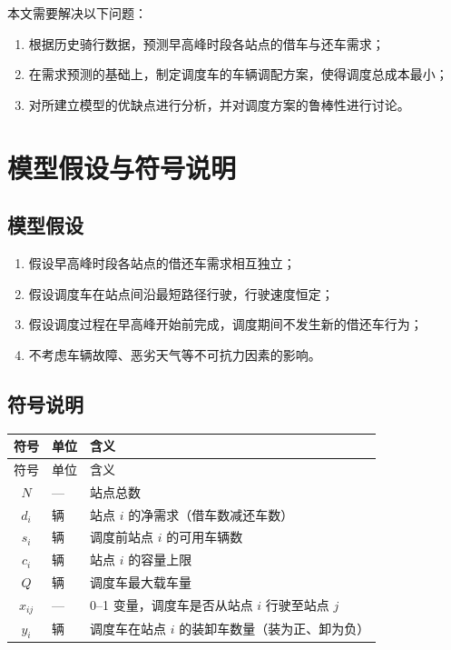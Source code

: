 \documentclass[zihao=-4,a4paper]{ctexart}
\begin{document}
\quad 本文需要解决以下问题：
\begin{enumerate}
  \item 根据历史骑行数据，预测早高峰时段各站点的借车与还车需求；
  \item 在需求预测的基础上，制定调度车的车辆调配方案，使得调度总成本最小；
  \item 对所建立模型的优缺点进行分析，并对调度方案的鲁棒性进行讨论。
\end{enumerate}

\section{模型假设与符号说明}

\subsection{模型假设}

\begin{enumerate}
  \item 假设早高峰时段各站点的借还车需求相互独立；
  \item 假设调度车在站点间沿最短路径行驶，行驶速度恒定；
  \item 假设调度过程在早高峰开始前完成，调度期间不发生新的借还车行为；
  \item 不考虑车辆故障、恶劣天气等不可抗力因素的影响。
\end{enumerate}

\subsection{符号说明}

\begin{longtable}{clp{9.5cm}}
  \toprule
  符号 & 单位 & 含义 \\
  \midrule
  \endfirsthead
  \toprule
  符号 & 单位 & 含义 \\
  \midrule
  \endhead
  $N$      & —    & 站点总数 \\
  $d_i$     & 辆   & 站点 $i$ 的净需求（借车数减还车数） \\
  $s_i$     & 辆   & 调度前站点 $i$ 的可用车辆数 \\
  $c_i$     & 辆   & 站点 $i$ 的容量上限 \\
  $Q$       & 辆   & 调度车最大载车量 \\
  $x_{ij}$  & —    & 0--1 变量，调度车是否从站点 $i$ 行驶至站点 $j$ \\
  $y_{i}$   & 辆   & 调度车在站点 $i$ 的装卸车数量（装为正、卸为负） \\
  \bottomrule
\end{longtable}
\end{document}
